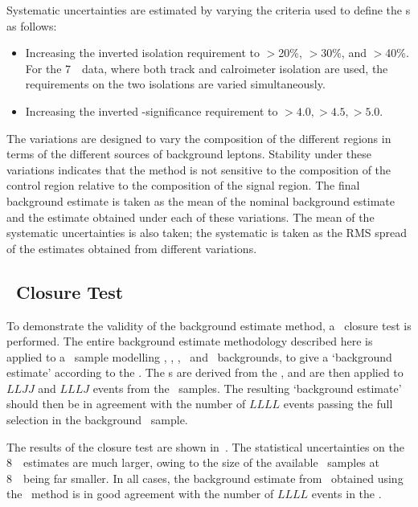 Systematic uncertainties are estimated by varying the criteria used to define
the \lljet s as follows:
\begin{itemize}
\item Increasing the inverted isolation requirement to $>$20\%, $>$30\%, and
$>$40\%. For the 7~\tev\ data, where both track and calroimeter isolation are
used, the requirements on the two isolations are varied
simultaneously.
\item Increasing the inverted \dzero-significance requirement to
$>4.0,>4.5,>5.0$.
\end{itemize}
The variations are designed to vary the composition of the different regions in
terms of the different sources of background leptons. Stability under these
variations indicates that the method is not sensitive to the composition of the
control region relative to the composition of the signal region. The final
background estimate is taken as the mean of the nominal background estimate and
the estimate obtained under each of these variations. The mean of the systematic
uncertainties is also taken; the systematic is taken as the RMS spread of the
estimates obtained from different variations.

\subsection{\mc\ Closure Test}

To demonstrate the validity of the background estimate method, a \mc\ closure
test is performed. The entire background estimate methodology described here is
applied to a \mc\ sample modelling \Zjets, \ttbar,
\singletop, \WZ\ and \WW\ backgrounds, to give a `background estimate' according
to the \mc. The \ffactor s are derived from the \mc, and are then applied
to $LLJJ$ and $LLLJ$ events from the \mc\ samples. The resulting `background
estimate' should then be in agreement with the number of $LLLL$ events passing the full
selection in the background \mc\ sample.


The results of the closure test are shown in~. The
statistical uncertainties on the 8~\tev\ estimates are much larger, owing to the
size of the available \mc\ samples at 8~\tev\ being far smaller. In all cases, the
background estimate from \mc\ obtained using the \ffactor\ method is in good
agreement with the number of $LLLL$ events in the \mc.

